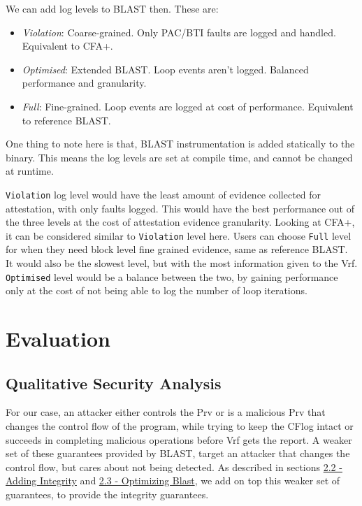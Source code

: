 \documentclass[a4paper, nobind]{templates/ociamthesis}
\providecommand{\tightlist}{%
  \setlength{\itemsep}{0pt}\setlength{\parskip}{0pt}}
\begin{document}
We can add log levels to BLAST then. These are:

\begin{itemize}
\tightlist
\item
  \emph{Violation}: Coarse-grained. Only PAC/BTI faults are logged and handled. Equivalent to CFA+.
\item
  \emph{Optimised}: Extended BLAST. Loop events aren't logged. Balanced performance and granularity.
\item
  \emph{Full}: Fine-grained. Loop events are logged at cost of performance. Equivalent to reference BLAST.
\end{itemize}

One thing to note here is that, BLAST instrumentation is added statically to the binary.
This means the log levels are set at compile time, and cannot be changed at runtime.

\texttt{Violation} log level would have the least amount of evidence collected for attestation,
with only faults logged. This would have the best performance out of the three levels
at the cost of attestation evidence granularity. Looking at CFA+, it can be considered
similar to \texttt{Violation} level here. Users can choose \texttt{Full} level
for when they need block level fine grained evidence, same as reference BLAST.
It would also be the slowest level, but with the most information given to the Vrf.
\texttt{Optimised} level would be a balance between the two, by gaining performance
only at the cost of not being able to log the number of loop iterations.

\chapter{Evaluation}\label{evaluation}

\minitoc 

\section{Qualitative Security Analysis}\label{qualitative-security-analysis}

For our case, an attacker either controls the Prv or is a malicious Prv that changes
the control flow of the program, while trying to keep the CFlog intact
or succeeds in completing malicious operations before Vrf gets the report.
A weaker set of these guarantees provided by BLAST, target an attacker that changes the control flow,
but cares about not being detected.
As described in sections \hyperref[adding-integrity]{2.2 - Adding Integrity} and
\hyperref[optimizing-blast]{2.3 - Optimizing Blast}, we add on top this weaker set of guarantees,
to provide the integrity guarantees.
\end{document}
